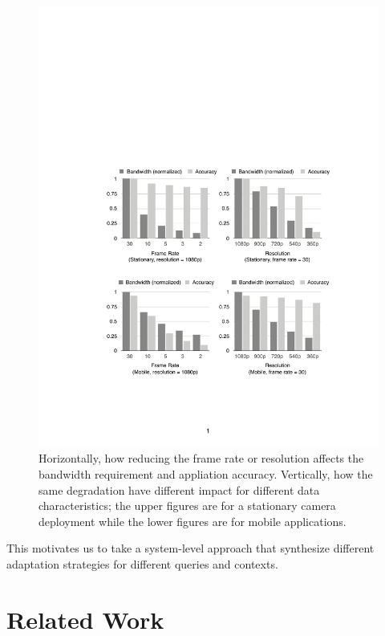 \begin{figure}
  \centering
  \includegraphics[width=\linewidth]{figures/motiv.pdf}
  \caption{Horizontally, how reducing the frame rate or resolution affects the
    bandwidth requirement and appliation accuracy. Vertically, how the same
    degradation have different impact for different data characteristics; the
    upper figures are for a stationary camera deployment while the lower figures
    are for mobile applications.}
  \label{fig:motiv}
\end{figure}

This motivates us to take a system-level approach that synthesize different
adaptation strategies for different queries and contexts.

\section{Related Work}
\label{sec:related-work}

